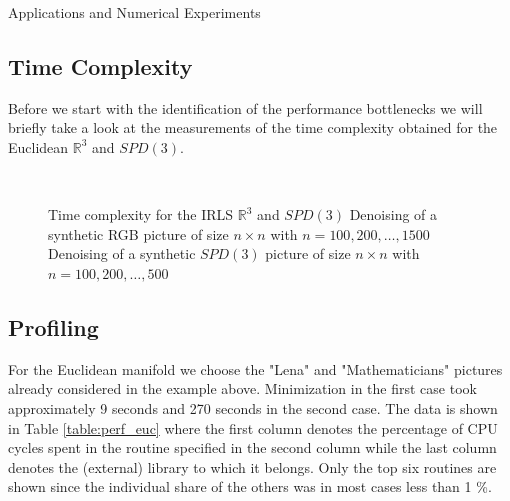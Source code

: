 \begin{chapter}{Applications and Numerical Experiments}
\subsection{Time Complexity}
Before we start with the identification of the performance bottlenecks we will briefly take a look at the measurements of the time complexity
obtained for the Euclidean $\mathbb{R}^3$ and $SPD(3)$. 
\begin{figure}[h!]
    \centering
    \\
    \caption[Time complexity IRLS $\mathbb{R}^3$ and $SPD(3)$]{Time complexity for the IRLS $\mathbb{R}^3$ and $SPD(3)$
	 Denoising of a synthetic RGB picture of size $n\times n$ with $n=100, 200, \ldots, 1500$
	 Denoising of a synthetic $SPD(3)$ picture of size $n\times n$ with $n=100, 200, \ldots, 500$
	\label{fig:complexity}
    }
\end{figure}


\subsection{Profiling}
For the Euclidean manifold we choose the "Lena" and "Mathematicians" pictures already considered in the example above. Minimization in the first case took approximately 9 seconds and 270 seconds in
the second case. The data is shown in Table \ref{table:perf_euc} where the first column denotes the percentage of CPU cycles spent in the routine specified in the second column 
while the last column denotes the (external) library to which it belongs. Only the top six routines are shown since the individual share of the others was in most cases less than 1 \%. \\


\end{chapter}
